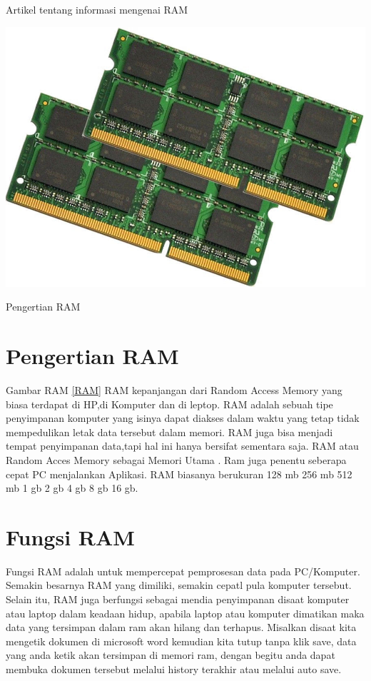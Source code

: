 ﻿%





Artikel tentang informasi mengenai RAM

  \begin{figures}[ht]
  \centerline{\includegraphics[width=1\textwidth]{figures/RAM.jpg}}
  \caption{Pengertian RAM}
  \label{RAM}
  \end{figures}

\section{Pengertian RAM}
Gambar RAM \ref{RAM}
RAM kepanjangan dari Random Access Memory yang biasa terdapat di HP,di Komputer dan di leptop.
RAM adalah sebuah tipe penyimpanan komputer yang isinya dapat diakses dalam waktu yang tetap tidak mempedulikan letak data tersebut dalam memori.
RAM juga bisa menjadi tempat penyimpanan data,tapi hal ini hanya bersifat sementara saja.
RAM atau Random Acces Memory sebagai Memori Utama . Ram juga penentu seberapa cepat PC menjalankan Aplikasi.
RAM biasanya berukuran 128 mb 256 mb 512 mb 1 gb 2 gb 4 gb 8 gb 16 gb.

\section{Fungsi RAM}
Fungsi RAM adalah untuk mempercepat pemprosesan data pada PC/Komputer. Semakin besarnya RAM yang dimiliki, semakin cepatl pula komputer tersebut.
Selain itu, RAM juga berfungsi sebagai mendia penyimpanan disaat komputer atau laptop dalam keadaan hidup, apabila laptop atau komputer dimatikan maka data yang tersimpan dalam ram akan hilang dan terhapus. Misalkan disaat kita mengetik dokumen di microsoft word kemudian kita tutup tanpa klik save, data yang anda ketik akan tersimpan di memori ram, dengan begitu anda dapat membuka dokumen tersebut melalui history terakhir atau melalui auto save.

